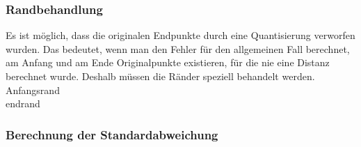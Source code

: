 \subsubsection{Randbehandlung}
Es ist möglich, dass die originalen Endpunkte durch eine Quantisierung verworfen wurden. Das bedeutet, wenn man den Fehler für den allgemeinen Fall berechnet, am Anfang und am Ende Originalpunkte existieren, für die nie eine Distanz berechnet wurde. Deshalb müssen die Ränder speziell behandelt werden.\\
Anfangsrand\\
endrand

\subsubsection{Berechnung der Standardabweichung}
